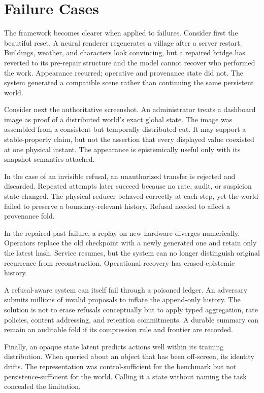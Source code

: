 \documentclass[11pt]{article}
\begin{document}
\section{Failure Cases}

The framework becomes clearer when applied to failures. Consider first the beautiful reset. A neural renderer regenerates a village after a server restart. Buildings, weather, and characters look convincing, but a repaired bridge has reverted to its pre-repair structure and the model cannot recover who performed the work. Appearance recurred; operative and provenance state did not. The system generated a compatible scene rather than continuing the same persistent world.

Consider next the authoritative screenshot. An administrator treats a dashboard image as proof of a distributed world's exact global state. The image was assembled from a consistent but temporally distributed cut. It may support a stable-property claim, but not the assertion that every displayed value coexisted at one physical instant. The appearance is epistemically useful only with its snapshot semantics attached.

In the case of an invisible refusal, an unauthorized transfer is rejected and discarded. Repeated attempts later succeed because no rate, audit, or suspicion state changed. The physical reducer behaved correctly at each step, yet the world failed to preserve a boundary-relevant history. Refusal needed to affect a provenance fold.

In the repaired-past failure, a replay on new hardware diverges numerically. Operators replace the old checkpoint with a newly generated one and retain only the latest hash. Service resumes, but the system can no longer distinguish original recurrence from reconstruction. Operational recovery has erased epistemic history.

A refusal-aware system can itself fail through a poisoned ledger. An adversary submits millions of invalid proposals to inflate the append-only history. The solution is not to erase refusals conceptually but to apply typed aggregation, rate policies, content addressing, and retention commitments. A durable summary can remain an auditable fold if its compression rule and frontier are recorded.

Finally, an opaque state latent predicts actions well within its training distribution. When queried about an object that has been off-screen, its identity drifts. The representation was control-sufficient for the benchmark but not persistence-sufficient for the world. Calling it a state without naming the task concealed the limitation.
\end{document}
